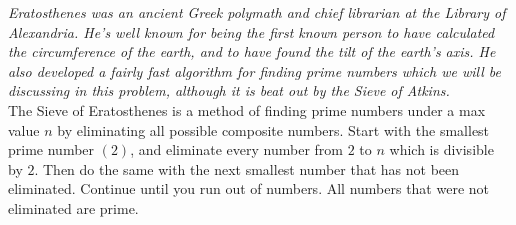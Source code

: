 \question
\textit{Eratosthenes was an ancient Greek polymath and chief librarian at the Library of Alexandria. He's well known for being the first known person to have calculated the circumference of the earth, and to have found the tilt of the earth's axis. He also developed a fairly fast algorithm for finding prime numbers which we will be discussing in this problem, although it is beat out by the Sieve of Atkins.}\\

The Sieve of Eratosthenes is a method of finding prime numbers under a max value $n$ by eliminating all possible composite numbers. Start with the smallest prime number $(2)$, and eliminate every number from $2$ to $n$ which is divisible by $2$. Then do the same with the next smallest number that has not been eliminated. Continue until you run out of numbers. All numbers that were not eliminated are prime. 

\\

